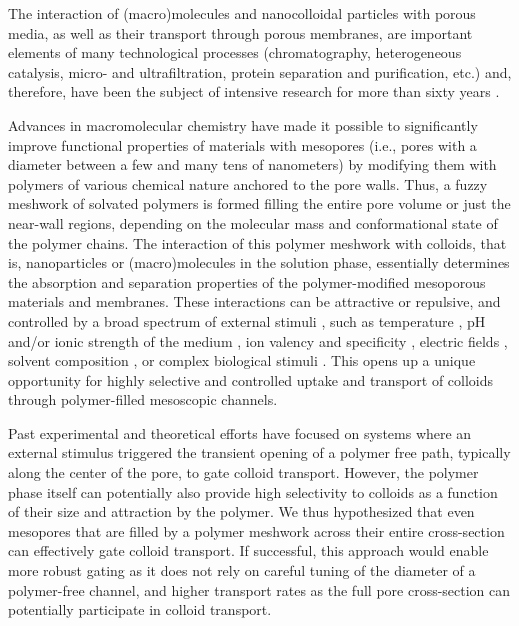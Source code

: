 \documentclass[12pt, a4paper]{article}
\begin{document}
The interaction of (macro)molecules and nanocolloidal particles with porous media, as well as their transport through porous membranes, are important elements of many technological processes (chromatography, heterogeneous catalysis, micro- and ultrafiltration, protein separation and purification, etc.) and, therefore, have been the subject of intensive research for more than sixty years \cite{Watson1959, Rout2003, Huang2023, Uredat2024}.

Advances in macromolecular chemistry have made it possible to significantly improve functional properties of materials with mesopores (i.e., pores with a diameter between a few and many tens of nanometers) by modifying them with polymers of various chemical nature anchored to  the pore walls.
Thus, a fuzzy meshwork of solvated polymers is formed filling the entire pore volume or just the near-wall regions, depending on the molecular mass and conformational state of the polymer chains.
The interaction of this polymer meshwork with colloids, that is, nanoparticles or (macro)molecules in the solution phase, essentially determines the absorption and separation properties of the polymer-modified mesoporous materials and membranes.
These interactions can be attractive or repulsive, and controlled by a broad spectrum of external stimuli \cite{Jeong2002, Lee2010, Low2019}, 
such as temperature                     \cite{Stetsyshyn2020}, 
pH and/or ionic strength of the medium  \cite{Dai2008, Zhang2005}, 
ion valency and specificity             \cite{Zhulina1999, Robertson2021},
electric fields                         \cite{Lokuge2005}, 
solvent composition                     \cite{Halperin2011, Darabi2016}, 
or complex biological stimuli           \cite{Ikeda2010, Lu2003}.
This opens up a unique opportunity for highly selective and controlled uptake and transport of colloids through polymer-filled mesoscopic channels.

Past experimental and theoretical efforts have focused on systems where an external stimulus triggered the transient opening of a polymer free path, typically along the center of the pore, to gate colloid transport.
However, the polymer phase itself can potentially also provide high selectivity to colloids as a function of their size and attraction by the polymer.
We thus hypothesized that even mesopores that are filled by a polymer meshwork across their entire cross-section can effectively gate colloid transport.
If successful, this approach would enable more robust gating as it does not rely on careful tuning of the diameter of a polymer-free channel, and higher transport rates as the full pore cross-section can potentially participate in colloid transport.
\end{document}
